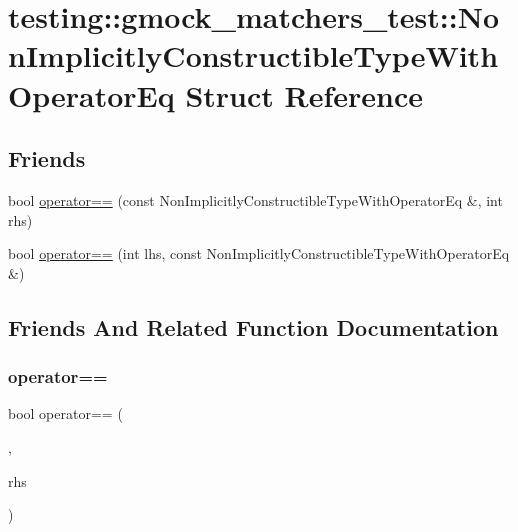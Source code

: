 \hypertarget{structtesting_1_1gmock__matchers__test_1_1_non_implicitly_constructible_type_with_operator_eq}{}\section{testing\+::gmock\+\_\+matchers\+\_\+test\+::Non\+Implicitly\+Constructible\+Type\+With\+Operator\+Eq Struct Reference}
\label{structtesting_1_1gmock__matchers__test_1_1_non_implicitly_constructible_type_with_operator_eq}
\subsection*{Friends}
\begin{DoxyCompactItemize}
\item 
bool \mbox{\hyperlink{structtesting_1_1gmock__matchers__test_1_1_non_implicitly_constructible_type_with_operator_eq_a20e9067f1f4becd397742e0db7351d6a}{operator==}} (const Non\+Implicitly\+Constructible\+Type\+With\+Operator\+Eq \&, int rhs)
\item 
bool \mbox{\hyperlink{structtesting_1_1gmock__matchers__test_1_1_non_implicitly_constructible_type_with_operator_eq_a801c8151d7f7ff24243019980934d143}{operator==}} (int lhs, const Non\+Implicitly\+Constructible\+Type\+With\+Operator\+Eq \&)
\end{DoxyCompactItemize}


\subsection{Friends And Related Function Documentation}
\mbox{\label{structtesting_1_1gmock__matchers__test_1_1_non_implicitly_constructible_type_with_operator_eq_a20e9067f1f4becd397742e0db7351d6a}} 
\subsubsection{\texorpdfstring{operator==}{operator==}\hspace{0.1cm}{\footnotesize\ttfamily [1/2]}}
{\footnotesize\ttfamily bool operator== (\begin{DoxyParamCaption}\item[{const Non\+Implicitly\+Constructible\+Type\+With\+Operator\+Eq \&}]{,  }\item[{int}]{rhs }\end{DoxyParamCaption})\hspace{0.3cm}{\ttfamily [friend]}}

